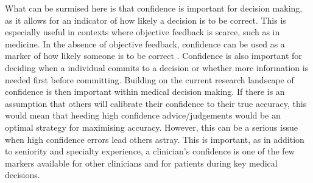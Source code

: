 \documentclass[a4paper, nobind]{templates/ociamthesis}
\begin{document}
\hfill\break
What can be surmised here is that confidence is important for decision making, as it allows for an indicator of how likely a decision is to be correct. This is especially useful in contexts where objective feedback is scarce, such as in medicine. In the absence of objective feedback, confidence can be used as a marker of how likely someone is to be correct \autocite{price_intuitive_2004}. Confidence is also important for deciding when a individual commits to a decision or whether more information is needed first before committing. Building on the current research landscape of confidence is then important within medical decision making. If there is an assumption that others will calibrate their confidence to their true accuracy, this would mean that heeding high confidence advice/judgements would be an optimal strategy for maximising accuracy. However, this can be a serious issue when high confidence errors lead others astray. This is important, as in addition to seniority and specialty experience, a clinician's confidence is one of the few markers available for other clinicians and for patients during key medical decisions.
\end{document}

